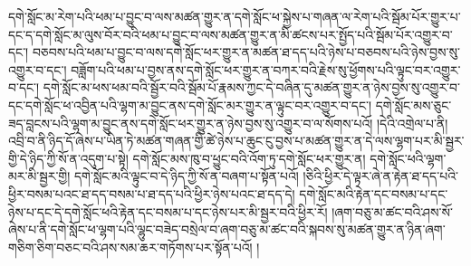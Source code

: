 དགེ་སློང་མ་རེག་པའི་ཕམ་པ་བྱུང་བ་ལས་མཚན་གྱུར་ན་དགེ་སློང་ཕ་སྐྱེས་པ་གཞན་ལ་རེག་པའི་སྦོམ་པོར་གྱུར་པ་དང་ད་དགེ་སློང་མ་ལུས་བོར་བའི་ཕམ་པ་བྱུང་བ་ལས་མཚན་གྱུར་ན་མི་ཚངས་པར་སྤྱོད་པའི་སྦོམ་པོར་འགྱུར་བ་དང་། བཅབས་པའི་ཕམ་པ་བྱུང་བ་ལས་དགེ་སློང་ཕར་གྱུར་ན་མཚན་ཐ་དད་པའི་ཉེས་པ་བཅབས་པའི་ཉེས་བྱས་སུ་འགྱུར་བ་དང་། བཟློག་པའི་ཕམ་པ་བྱས་ནས་དགེ་སློང་ཕར་གྱུར་ན་བཀར་བའི་རྗེས་སུ་ཕྱོགས་པའི་ལྟུང་བར་འགྱུར་བ་དང་། དགེ་སློང་མ་ཕས་ཕམ་བའི་སྦྱོར་བའི་སྦོམ་པོ་རྣམས་ཀྱང་དེ་བཞིན་དུ་མཚན་གྱུར་ན་ཉེས་བྱས་སུ་འགྱུར་བ་དང་དགེ་སློང་ཕ་འབྱིན་པའི་ལྷག་མ་བྱུང་ནས་དགེ་སློང་མར་གྱུར་ན་ལྟུང་བར་འགྱུར་བ་དང་། དགེ་སློང་མས་ཅུང་ཟད་བླངས་པའི་ལྷག་མ་བྱུང་ནས་དགེ་སློང་ཕར་གྱུར་ན་ཉེས་བྱས་སུ་འགྱུར་བ་ལ་སོགས་པའོ། །དེའི་འགྲེལ་པ་ནི། འབྲི་བ་ནི་ཉིད་དོ་ཞེས་པ་ཡིན་ཏེ་མཚན་གཞན་གྱི་ཚེ་ཉེས་པ་ཆུང་ངུ་བྱས་པ་མཚན་གྱུར་ན་དེ་ལས་ལྷག་པར་མི་སྦྱར་གྱི་དེ་ཉིད་ཀྱི་སོ་ན་འདུག་པ་སྟེ། དགེ་སློང་མས་ཁུ་བ་ཕྱུང་བའི་འོག་ཏུ་དགེ་སློང་ཕར་གྱུར་ན། དགེ་སློང་ཕའི་ལྷག་མར་མི་སྦྱར་གྱི། དགེ་སློང་མའི་ལྟུང་བ་དེ་ཉིད་ཀྱི་སོ་ན་བཞག་པ་སྟོན་པའོ། །ཅིའི་ཕྱིར་དེ་ལྟར་ཞེ་ན་རྟེན་ཐ་དད་པའི་ཕྱིར་བསམ་པའང་ཐ་དད་བསམ་པ་ཐ་དད་པའི་ཕྱིར་ཉེས་པའང་ཐ་དད་དེ། དགེ་སློང་མའི་རྟེན་དང་བསམ་པ་དང་ཉེས་པ་དང་དེ་དགེ་སློང་ཕའི་རྟེན་དང་བསམ་པ་དང་ཉེས་པར་མི་སྦྱར་བའི་ཕྱིར་རོ། །ཞག་བཅུ་མ་ཚང་བའི་ཤས་སོ་ཞེས་པ་ནི་དགེ་སློང་ཕ་ལྷག་པའི་ལྷུང་བཟེད་བསྲེལ་བ་ཞག་བཅུ་མ་ཚང་བའི་སྐབས་སུ་མཚན་གྱུར་ན་ཉིན་ཞག་གཅིག་ཅིག་བཅང་བའི་ཤས་སམ་ཆར་གཏོགས་པར་སྟོན་པའོ། །
